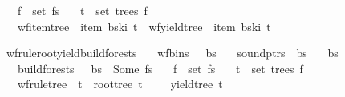 \begin{isabellebody}
\ \ \ {\isachardoublequoteopen}f\ {\isasymin}\ set\ fs{\isachardoublequoteclose}\isanewline
\ \ \ {\isachardoublequoteopen}t\ {\isasymin}\ set\ {\isacharparenleft}{\kern0pt}trees\ f{\isacharparenright}{\kern0pt}{\isachardoublequoteclose}\isanewline
\ \ \ {\isachardoublequoteopen}wf{\isacharunderscore}{\kern0pt}item{\isacharunderscore}{\kern0pt}tree\ {\isasymG}\ {\isacharparenleft}{\kern0pt}item\ {\isacharparenleft}{\kern0pt}bs{\isacharbang}{\kern0pt}k{\isacharbang}{\kern0pt}i{\isacharparenright}{\kern0pt}{\isacharparenright}{\kern0pt}\ t\ {\isasymand}\ wf{\isacharunderscore}{\kern0pt}yield{\isacharunderscore}{\kern0pt}tree\ {\isasymomega}\ {\isacharparenleft}{\kern0pt}item\ {\isacharparenleft}{\kern0pt}bs{\isacharbang}{\kern0pt}k{\isacharbang}{\kern0pt}i{\isacharparenright}{\kern0pt}{\isacharparenright}{\kern0pt}\ t{\isachardoublequoteclose}%
\isadelimproof
%
\endisadelimproof
%
\isatagproof
%
\endisatagproof
{\isafoldproof}%
%
\isadelimproof
%
\endisadelimproof
%
\begin{isamarkuptext}%
%
\end{isamarkuptext}\isamarkuptrue%
\isamarkupfalse%
\ wf{\isacharunderscore}{\kern0pt}rule{\isacharunderscore}{\kern0pt}root{\isacharunderscore}{\kern0pt}yield{\isacharunderscore}{\kern0pt}build{\isacharunderscore}{\kern0pt}forests{\isacharcolon}{\kern0pt}\isanewline
\ \ \ {\isachardoublequoteopen}wf{\isacharunderscore}{\kern0pt}bins\ {\isasymG}\ {\isasymomega}\ bs{\isachardoublequoteclose}\isanewline
\ \ \ {\isachardoublequoteopen}sound{\isacharunderscore}{\kern0pt}ptrs\ {\isasymomega}\ bs{\isachardoublequoteclose}\isanewline
\ \ \ {\isachardoublequoteopen}{\isacharbar}{\kern0pt}bs{\isacharbar}{\kern0pt}\ {\isacharequal}{\kern0pt}\ {\isacharbar}{\kern0pt}{\isasymomega}{\isacharbar}{\kern0pt}\ {\isacharplus}{\kern0pt}\ {}{\isachardoublequoteclose}\isanewline
\ \ \ {\isachardoublequoteopen}build{\isacharunderscore}{\kern0pt}forests\ {\isasymG}\ {\isasymomega}\ bs\ {\isacharequal}{\kern0pt}\ Some\ fs{\isachardoublequoteclose}\isanewline
\ \ \ {\isachardoublequoteopen}f\ {\isasymin}\ set\ fs{\isachardoublequoteclose}\isanewline
\ \ \ {\isachardoublequoteopen}t\ {\isasymin}\ set\ {\isacharparenleft}{\kern0pt}trees\ f{\isacharparenright}{\kern0pt}{\isachardoublequoteclose}\isanewline
\ \ \ {\isachardoublequoteopen}wf{\isacharunderscore}{\kern0pt}rule{\isacharunderscore}{\kern0pt}tree\ {\isasymG}\ t\ {\isasymand}\ root{\isacharunderscore}{\kern0pt}tree\ t\ {\isacharequal}{\kern0pt}\ {\isasymSS}\ {\isasymG}\ {\isasymand}\ yield{\isacharunderscore}{\kern0pt}tree\ t\ {\isacharequal}{\kern0pt}\ {\isasymomega}{\isachardoublequoteclose}%

\end{isabellebody}
